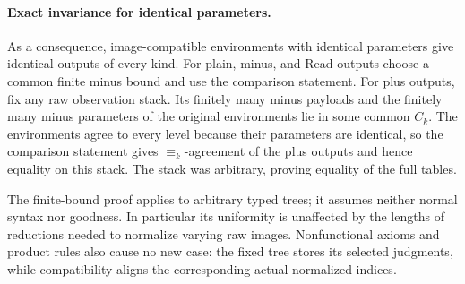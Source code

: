 \paragraph{Exact invariance for identical parameters.}
\label{obs:bound-exact-invariance}
As a consequence, image-compatible environments with identical parameters
give identical outputs of every kind.  For plain, minus, and Read
outputs choose a common finite minus bound and use the comparison
statement.  For plus outputs, fix any raw observation stack.  Its
finitely many minus payloads and the finitely many minus parameters of
the original environments lie in some common $C_k$.  The environments
agree to every level because their parameters are identical, so the
comparison statement gives $\equiv_k$-agreement of the plus outputs
and hence equality on this stack.  The stack was arbitrary, proving
equality of the full tables.

The finite-bound proof applies to arbitrary typed trees; it assumes
neither normal syntax nor goodness.  In particular its uniformity is
unaffected by the lengths of reductions needed to normalize varying
raw images.  Nonfunctional axioms and product rules also cause no new
case: the fixed tree stores its selected judgments, while compatibility
aligns the corresponding actual normalized indices.
